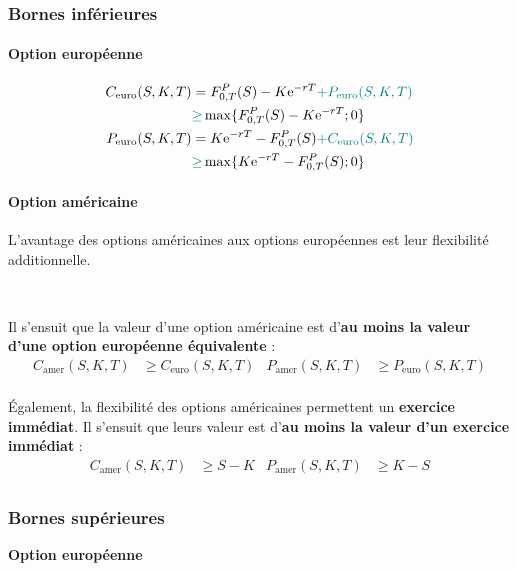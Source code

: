\documentclass[10pt, french]{article}
\begin{document}
\begin{multicols*}{2}
\subsubsection*{Bornes inférieures}
\paragraph{Option européenne}
\begin{align*}
	C_{\text{euro}}(S, K, T)	
	&=	F_{0, T}^{P}(S) - K\textrm{e}^{-rT} \textcolor{teal}{+ P_{\text{euro}}(S, K, T)}	\\
	&\textcolor{teal}{\geq}	\max\{F_{0, T}^{P}(S) - K\textrm{e}^{-rT}; 0\}	\\
	P_{\text{euro}}(S, K, T)	
	&=	K\textrm{e}^{-rT} - F_{0, T}^{P}(S) \textcolor{teal}{+ C_{\text{euro}}(S, K, T)}	\\
	&\textcolor{teal}{\geq}	\max\{K\textrm{e}^{-rT} - F_{0, T}^{P}(S); 0\}
\end{align*}

\paragraph{Option américaine}	L'avantage des options américaines aux options européennes est leur flexibilité additionnelle.

\

Il s'ensuit que la valeur d'une option américaine est d'\textbf{au moins la valeur d'une option européenne équivalente} : 
\begin{align*}
	C_{\text{amer}}(S, K, T)	
	&\geq	C_{\text{euro}}(S, K, T)		&
	P_{\text{amer}}(S, K, T)	
	&\geq	P_{\text{euro}}(S, K, T)		\\
\end{align*}

Également, la flexibilité des options américaines permettent un \textbf{exercice immédiat}. Il s'ensuit que leurs valeur est d'\textbf{au moins la valeur d'un exercice immédiat} :
\begin{align*}
	C_{\text{amer}}(S, K, T)	
	&\geq	S	-	K		&
	P_{\text{amer}}(S, K, T)	
	&\geq	K	-	S		\\
\end{align*}


\subsubsection*{Bornes supérieures}
\begin{center}
	\textbf{Option européenne}
\end{center}


\end{multicols*}
\end{document}
